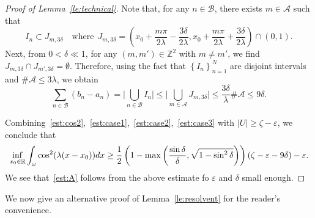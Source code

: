 \documentclass[a4paper,reqno]{amsart}
\theoremstyle{definition}
\numberwithin{equation}{section}
\newcommand{\R}{\mathbb{R}}
\def \R {{\mathbb{R} }}
\def \d {{\rm{d}}}
\begin{document}
\begin{proof}[Proof of Lemma~\ref{le:technical}]
Note that, for any $n\in \mathcal{B}$, there exists $m\in\mathcal{A}$ such that 
\begin{equation*}
I_{n}\subset {J}_{m,3\delta}\quad \mbox{where}\ \ 
{J}_{m,3\delta}=\left(x_{0}+\frac{m \pi }{2\lambda}-\frac{3\delta}{2\lambda},x_{0}+\frac{m \pi }{2\lambda}+\frac{3\delta}{2\lambda}\right)\cap(0,1).
\end{equation*}
Next, from $0<\delta\ll 1$, for any $(m,m')\in \mathbb{Z}^{2}$ with $m\ne m'$, we find ${J}_{m,3\delta}\cap
{J}_{m',3\delta}=\emptyset$.
Therefore, using the fact that $\left\{I_{n}\right\}_{n=1}^{N}$ are disjoint intervals and $\# \mathcal{A}\le 3\lambda$, we obtain
    \begin{equation}\label{est:case3}
   \sum_{n\in \mathcal{B}}(b_{n}-a_{n})=\bigg|\bigcup\limits_{n\in \mathcal{B}}I_{n}\bigg|\le \bigg|\bigcup\limits_{m\in \mathcal{A}}{J}_{m,3\delta}\bigg|\le \frac{3\delta}{\lambda}\#\mathcal{A}\le  9\delta.
   \end{equation}
   

   Combining~\eqref{est:cos2},~\eqref{est:case1},~\eqref{est:case2},~\eqref{est:case3} with $|U|\ge \zeta-\varepsilon$, we conclude that 
   \begin{equation*}
    \inf_{x_{0}\in \R}\int_{\omega}\cos^{2}(\lambda(x-x_{0}))\d x\ge \frac{1}{2}\left(1-\max\left(\frac{\sin \delta}{\delta},\sqrt{1-\sin^{2}\delta}\right)\right)(\zeta-\varepsilon-9\delta)-\varepsilon.
   \end{equation*}
   We see that~\eqref{est:A} follows from the above estimate fo $\varepsilon$ and $\delta$ small enough.
\end{proof}

We now give an alternative proof of Lemma~\ref{le:resolvent} for the reader's convenience.
\end{document}
